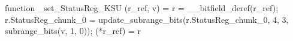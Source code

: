 function _set_StatusReg_KSU (r_ref, v) = {
    r = __bitfield_deref(r_ref);
    r.StatusReg_chunk_0 = update_subrange_bits(r.StatusReg_chunk_0, 4, 3, subrange_bits(v, 1, 0));
    (*r_ref) = r
}
